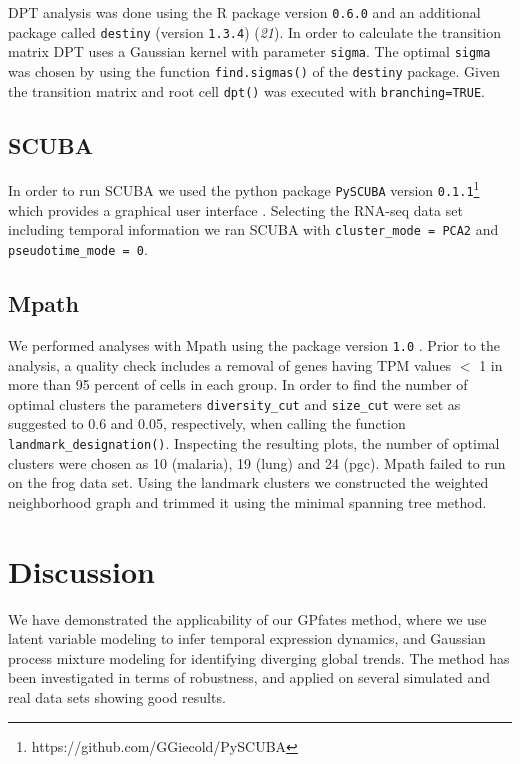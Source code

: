 DPT analysis was done using the R package version \texttt{0.6.0} and an additional package called \texttt{destiny} (version \texttt{1.3.4}) ({\it 21}). In order to calculate the transition matrix DPT uses a Gaussian kernel with parameter \texttt{sigma}. The optimal \texttt{sigma} was chosen by  using the function \texttt{find.sigmas()} of the \texttt{destiny} package. Given the transition matrix and root cell \texttt{dpt()} was executed with \texttt{branching=TRUE}.

\subsection{SCUBA}

In order to run SCUBA we used the python package \texttt{PySCUBA} version  \texttt{0.1.1}\footnote{https://github.com/GGiecold/PySCUBA} which provides a graphical user interface \cite{Marco2014-rf}. Selecting the RNA-seq data set including temporal information we ran SCUBA with  \texttt{cluster\_mode = PCA2} and \texttt{pseudotime\_mode = 0}.

\subsection{Mpath}

We performed analyses with Mpath using the package version \texttt{1.0} \cite{Chen2016-ar}. Prior to the analysis, a quality check includes a removal of genes having TPM values $ < $ 1 in more than 95 percent of cells in each group. In order to find the number of optimal clusters the parameters \texttt{diversity\_cut} and \texttt{size\_cut} were set as suggested to 0.6 and 0.05, respectively, when calling the function \texttt{landmark\_designation()}. Inspecting the resulting plots, the number of optimal clusters were chosen as 10 (malaria), 19 (lung) and 24 (pgc). Mpath failed to run on the frog data set. Using the landmark clusters we constructed the weighted neighborhood graph and trimmed it using the minimal spanning tree method. 

\section{Discussion}

We have demonstrated the applicability of our GPfates method, where we use latent variable modeling to infer temporal expression dynamics, and Gaussian process mixture modeling for identifying diverging global trends. The method has been investigated in terms of robustness, and applied on several simulated and real data sets showing good results.

